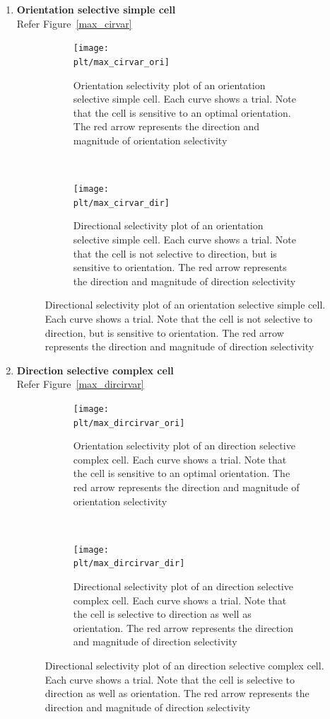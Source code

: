 \documentclass[11pt]{article}
\newcommand{\plt}{../../plots}
\newcommand{\rulesep}{\unskip\ \vrule\ }
\begin{document}
\begin{enumerate}
    \item \textbf{Orientation selective simple cell}\\
    Refer Figure~\ref{max_cirvar}
    \begin{figure}
    \centering
    \caption{Orientation selective simple cell}
    \label{max_cirvar}
    \begin{subfigure}{.48\textwidth}
        \centering
        \texttt{[image: \\plt/max\_cirvar\_ori]}
        \caption{Orientation selectivity plot of an orientation selective simple cell. Each curve shows a trial. Note that the cell is sensitive to an optimal orientation. The red arrow represents the direction and magnitude of orientation selectivity}
    \end{subfigure}
    \rulesep
    \begin{subfigure}{.48\textwidth}
        \centering
        \texttt{[image: \\plt/max\_cirvar\_dir]}
        \caption{Directional selectivity plot of an orientation selective simple cell. Each curve shows a trial. Note that the cell is not selective to direction, but is sensitive to orientation. The red arrow represents the direction and magnitude of direction selectivity}
    \end{subfigure}
    \end{figure}
    \item \textbf{Direction selective complex cell}\\
    Refer Figure~\ref{max_dircirvar}
    \begin{figure}
        \centering
        \caption{Direction selective complex cell}
        \label{max_dircirvar}
        \begin{subfigure}{.48\textwidth}
            \centering
            \texttt{[image: \\plt/max\_dircirvar\_ori]}
            \caption{Orientation selectivity plot of an direction selective complex cell. Each curve shows a trial. Note that the cell is sensitive to an optimal orientation. The red arrow represents the direction and magnitude of orientation selectivity}
        \end{subfigure}
        \rulesep
        \begin{subfigure}{.48\textwidth}
            \centering
            \texttt{[image: \\plt/max\_dircirvar\_dir]}
            \caption{Directional selectivity plot of an direction selective complex cell. Each curve shows a trial. Note that the cell is selective to direction as well as orientation. The red arrow represents the direction and magnitude of direction selectivity}

\end{subfigure}
\end{figure}
\end{enumerate}
\end{document}
